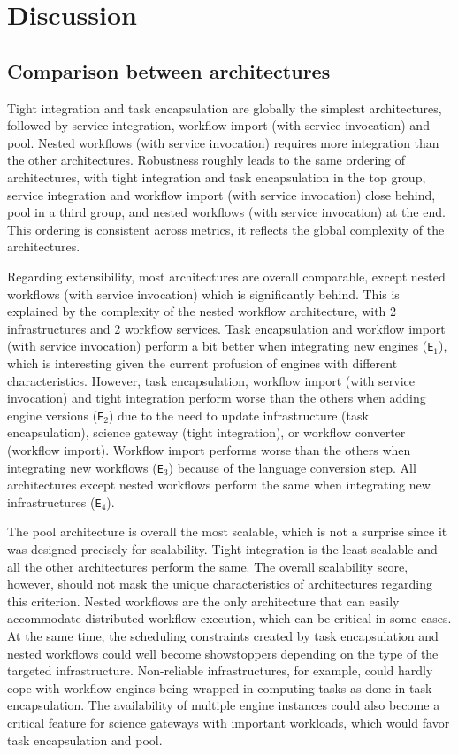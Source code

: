 \documentclass[preprint,3p,twocolumn]{elsarticle}
\begin{document}
\section{Discussion}

\subsection{Comparison between architectures}

Tight integration and task encapsulation are globally the simplest
architectures, followed by service integration, workflow import (with
service invocation) and pool. Nested workflows (with service
invocation) requires more integration than the other
architectures. Robustness roughly leads to the same ordering of
architectures, with tight integration and task encapsulation in the top
group, service integration and workflow import (with service
invocation) close behind, pool in a third group, and nested workflows
(with service invocation) at the end. This ordering is consistent
across metrics, it reflects the global complexity of the
architectures.

Regarding extensibility, most architectures are overall comparable,
except nested workflows (with service invocation) which is
significantly behind. This is explained by the complexity of the
nested workflow architecture, with 2 infrastructures and 2 workflow
services. Task encapsulation and workflow import (with service invocation)
perform a bit better when integrating new engines (\texttt{E$_1$}),
which is interesting given the current profusion of engines with
different characteristics.  However, task encapsulation, workflow import
(with service invocation) and tight integration perform worse than the
others when adding engine versions (\texttt{E$_2$}) due to the need to
update infrastructure (task encapsulation), science gateway (tight
integration), or workflow converter (workflow import). Workflow import
performs worse than the others when integrating new workflows
(\texttt{E$_3$}) because of the language conversion step. All
architectures except nested workflows perform the same when
integrating new infrastructures (\texttt{E$_4$}).

The pool architecture is overall the most scalable, which is not a
surprise since it was designed precisely for scalability. Tight
integration is the least scalable and all the other architectures
perform the same. The overall scalability score, however, should not
mask the unique characteristics of architectures regarding this
criterion. Nested workflows are the only architecture that can easily
accommodate distributed workflow execution, which can be critical in
some cases. At the same time, the scheduling constraints created by
task encapsulation and nested workflows could well become
showstoppers depending on the type of the targeted
infrastructure. Non-reliable infrastructures, for example, could
hardly cope with workflow engines being wrapped in computing tasks as
done in task encapsulation. The availability of multiple engine instances
could also become a critical feature for science gateways with
important workloads, which would favor task encapsulation and pool.
\end{document}
